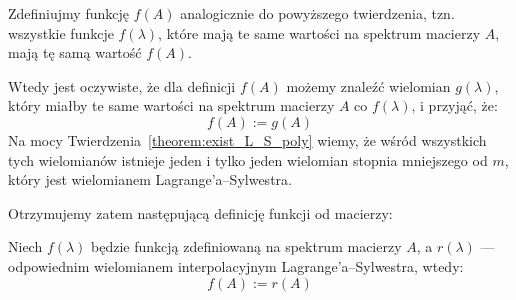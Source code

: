 Zdefiniujmy funkcję $f(A)$ analogicznie do powyższego twierdzenia, tzn. wszystkie funkcje $f(\lambda)$, które mają te same wartości na spektrum macierzy $A$, mają tę samą wartość $f(A)$.

Wtedy jest oczywiste, że dla definicji $f(A)$ możemy znaleźć wielomian $g(\lambda)$, który miałby te same wartości na spektrum macierzy $A$ co $f(\lambda)$, i przyjąć, że:
$$f(A) := g(A)$$
Na mocy Twierdzenia~\ref{theorem:exist_L_S_poly} wiemy, że wśród wszystkich tych wielomianów istnieje jeden i tylko jeden wielomian stopnia mniejszego od $m$, który jest wielomianem Lagrange'a--Sylwestra.

Otrzymujemy zatem następującą definicję funkcji od macierzy:
\begin{definition}
    Niech $f(\lambda)$ będzie funkcją zdefiniowaną na spektrum macierzy $A$, a $r(\lambda)$ --- odpowiednim wielomianem interpolacyjnym Lagrange'a--Sylwestra, wtedy:
    $$ f(A) := r(A) $$
\end{definition}

